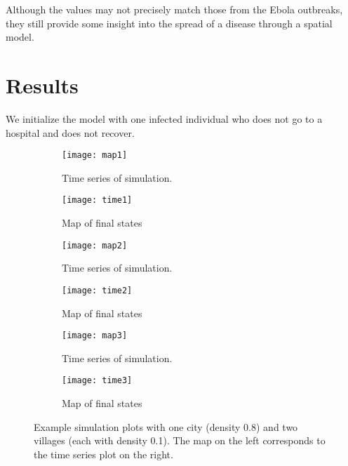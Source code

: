 Although the values may not precisely match those from the Ebola outbreaks, they still provide some insight into the spread of a disease through a spatial model.


\section{Results}

We initialize the model with one infected individual who does not go to a hospital and does not recover. 

\begin{figure}
\centering
\begin{subfigure}[t]{0.38\textwidth}
  \texttt{[image: map1]} 
  \caption{Time series of simulation.}
\end{subfigure}
\begin{subfigure}[t]{0.56\textwidth}
  \texttt{[image: time1]}
  \caption{Map of final states}
\end{subfigure}
\begin{subfigure}[t]{0.38\textwidth}
  \texttt{[image: map2]} 
  \caption{Time series of simulation.}
\end{subfigure}
\begin{subfigure}[t]{0.56\textwidth}
  \texttt{[image: time2]}
  \caption{Map of final states}
\end{subfigure}
\begin{subfigure}[t]{0.38\textwidth}
  \texttt{[image: map3]} 
  \caption{Time series of simulation.}
\end{subfigure}
\begin{subfigure}[t]{0.56\textwidth}
  \texttt{[image: time3]}
  \caption{Map of final states}
\end{subfigure}
\caption{Example simulation plots with one city (density 0.8) and two villages (each with density 0.1). The map on the left corresponds to the time series plot on the right.}
\end{figure}
